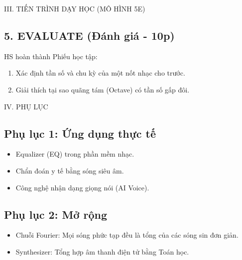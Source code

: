 \documentclass[12pt,a4paper]{article}
\begin{document}
\begin{sectionbox}{III. TIẾN TRÌNH DẠY HỌC (MÔ HÌNH 5E)}
\subsection*{5. EVALUATE (Đánh giá - 10p)}
HS hoàn thành Phiếu học tập:
\begin{enumerate}
    \item Xác định tần số và chu kỳ của một nốt nhạc cho trước.
    \item Giải thích tại sao quãng tám (Octave) có tần số gấp đôi.
\end{enumerate}
\end{sectionbox}

\newpage
\begin{sectionbox}{IV. PHỤ LỤC}
\subsection*{Phụ lục 1: Ứng dụng thực tế}
\begin{itemize}
    \item Equalizer (EQ) trong phần mềm nhạc.
    \item Chẩn đoán y tế bằng sóng siêu âm.
    \item Công nghệ nhận dạng giọng nói (AI Voice).
\end{itemize}

\subsection*{Phụ lục 2: Mở rộng}
\begin{itemize}
    \item Chuỗi Fourier: Mọi sóng phức tạp đều là tổng của các sóng sin đơn giản.
    \item Synthesizer: Tổng hợp âm thanh điện tử bằng Toán học.
\end{itemize}
\end{sectionbox}
\end{document}
